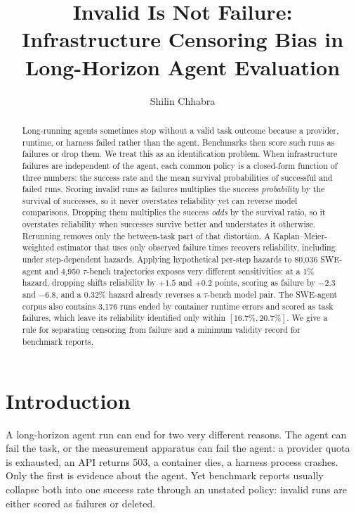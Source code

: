 \documentclass[letterpaper]{article} %
\title{Invalid Is Not Failure:\\
Infrastructure Censoring Bias in Long-Horizon Agent Evaluation}
\author{
    Shilin Chhabra
}
\begin{document}
\maketitle

\begin{abstract}
Long-running agents sometimes stop without a valid task outcome because a
provider, runtime, or harness failed rather than the agent. Benchmarks then
score such runs as failures or drop them. We treat this as an identification
problem. When infrastructure failures are independent of the agent, each common
policy is a closed-form function of three numbers: the success rate and the
mean survival probabilities of successful and failed runs. Scoring invalid runs
as failures multiplies the success \emph{probability} by the survival of
successes, so it never overstates reliability yet can reverse model
comparisons. Dropping them multiplies the success \emph{odds} by the survival
ratio, so it overstates reliability when successes survive better and
understates it otherwise. Rerunning removes only the between-task part of that
distortion. A Kaplan--Meier-weighted estimator that uses only observed failure
times recovers reliability, including under step-dependent hazards. Applying
hypothetical per-step hazards to 80{,}036 SWE-agent and 4{,}950 $\tau$-bench
trajectories exposes very different sensitivities: at a 1\% hazard, dropping
shifts reliability by $+1.5$ and $+0.2$ points, scoring as failure by $-2.3$ and
$-6.8$, and a 0.32\% hazard already reverses a $\tau$-bench model pair. The
SWE-agent corpus also contains 3{,}176 runs ended by container runtime errors
and scored as task failures, which leave its reliability identified only within
$[16.7\%, 20.7\%]$. We give a rule for separating censoring from failure and a
minimum validity record for benchmark reports.
\end{abstract}

\section{Introduction}

A long-horizon agent run can end for two very different reasons. The agent can
fail the task, or the measurement apparatus can fail the agent: a provider quota
is exhausted, an API returns 503, a container dies, a harness process crashes.
Only the first is evidence about the agent. Yet benchmark reports usually
collapse both into one success rate through an unstated policy: invalid runs are
either scored as failures or deleted.
\end{document}
